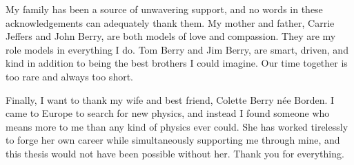 \begin{singlespace}
My family has been a source of unwavering support, and no
words in these acknowledgements can adequately thank them.  
My mother and father, Carrie Jeffers and John Berry,
are both models of love and 
compassion.  They are my role models in everything I do.
Tom Berry and Jim Berry, are smart, driven, and kind
in addition to being the best brothers I could imagine.
Our time together is too rare and always too short.

Finally, I want to thank my wife and best friend, Colette Berry n{\'e}e Borden.
I came to Europe to search for new physics, and instead I found
someone who means more to me than any kind of physics ever could.
She has worked tirelessly to forge her own career while
simultaneously supporting me through mine, and 
this thesis would not have been possible without her.
Thank you for everything.

\end{singlespace}
\newpage
\lhead{\leftmark} %
